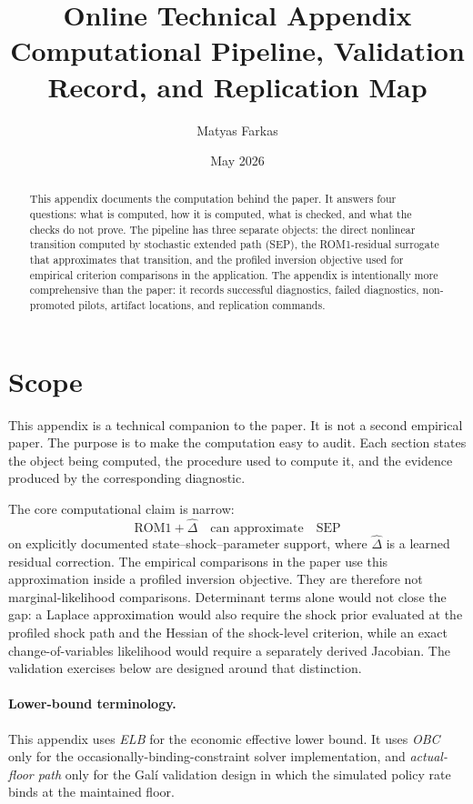\documentclass[12pt]{article}
\title{Online Technical Appendix\\
\large Computational Pipeline, Validation Record, and Replication Map}
\author{Matyas Farkas}
\date{May 2026}
\begin{document}
\maketitle

\begin{abstract}
\noindent
This appendix documents the computation behind the paper. It answers four
questions: what is computed, how it is computed, what is checked, and what the
checks do not prove. The pipeline has three separate objects: the direct
nonlinear transition computed by stochastic extended path (SEP), the
ROM1-residual surrogate that approximates that transition, and the profiled
inversion objective used for empirical criterion comparisons in the
application. The appendix is intentionally more comprehensive than the paper:
it records successful diagnostics, failed diagnostics, non-promoted pilots,
artifact locations, and replication commands.
\end{abstract}

\tableofcontents
\newpage

\section{Scope}
\label{apptech:scope}

This appendix is a technical companion to the paper. It is not a second
empirical paper. The purpose is to make the computation easy to audit. Each
section states the object being computed, the procedure used to compute it, and
the evidence produced by the corresponding diagnostic.

The core computational claim is narrow:
\[
  \text{ROM1} + \widehat{\Delta}
  \quad\text{can approximate}\quad
  \text{SEP}
\]
on explicitly documented state--shock--parameter support, where
\(\widehat{\Delta}\) is a learned residual correction. The empirical
comparisons in the paper use this approximation inside a profiled inversion
objective. They are therefore not marginal-likelihood comparisons. Determinant
terms alone would not close the gap: a Laplace approximation would also require
the shock prior evaluated at the profiled shock path and the Hessian of the
shock-level criterion, while an exact change-of-variables likelihood would
require a separately derived Jacobian. The validation exercises below are
designed around that distinction.

\paragraph{Lower-bound terminology.}
This appendix uses \emph{ELB} for the economic effective lower bound. It uses
\emph{OBC} only for the occasionally-binding-constraint solver
implementation, and \emph{actual-floor path} only for the Gal\'i validation
design in which the simulated policy rate binds at the maintained floor.
\end{document}
